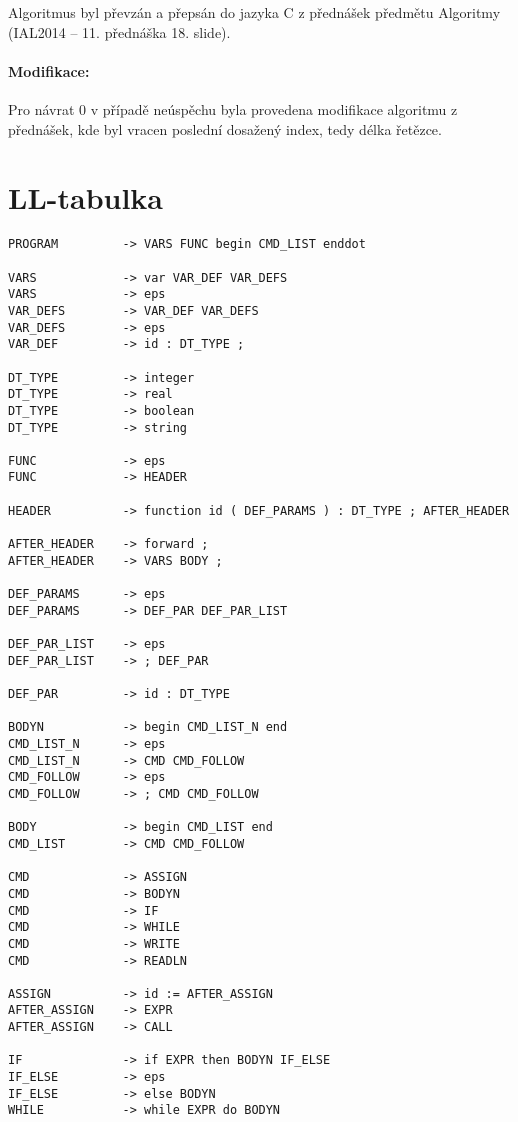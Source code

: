 \documentclass[12pt,a4paper,titlepage,final]{article}
\begin{document}
Algoritmus byl převzán a přepsán do jazyka C z přednášek předmětu Algoritmy (IAL2014
\cite{honzik2} -- 11. přednáška 18. slide).
 
\paragraph{Modifikace:} Pro návrat 0 v případě neúspěchu byla provedena modifikace
algoritmu z přednášek, kde byl vracen poslední dosažený index, tedy délka řetězce.




\section{LL-tabulka} \label{lltabulka}
\begin{verbatim}
PROGRAM         -> VARS FUNC begin CMD_LIST enddot

VARS            -> var VAR_DEF VAR_DEFS
VARS            -> eps
VAR_DEFS        -> VAR_DEF VAR_DEFS
VAR_DEFS        -> eps
VAR_DEF         -> id : DT_TYPE ;

DT_TYPE         -> integer
DT_TYPE         -> real
DT_TYPE         -> boolean
DT_TYPE         -> string

FUNC            -> eps
FUNC            -> HEADER

HEADER          -> function id ( DEF_PARAMS ) : DT_TYPE ; AFTER_HEADER

AFTER_HEADER    -> forward ;
AFTER_HEADER    -> VARS BODY ;

DEF_PARAMS      -> eps
DEF_PARAMS      -> DEF_PAR DEF_PAR_LIST

DEF_PAR_LIST    -> eps
DEF_PAR_LIST    -> ; DEF_PAR

DEF_PAR         -> id : DT_TYPE

BODYN           -> begin CMD_LIST_N end
CMD_LIST_N      -> eps
CMD_LIST_N      -> CMD CMD_FOLLOW
CMD_FOLLOW      -> eps
CMD_FOLLOW      -> ; CMD CMD_FOLLOW

BODY            -> begin CMD_LIST end
CMD_LIST        -> CMD CMD_FOLLOW

CMD             -> ASSIGN
CMD             -> BODYN
CMD             -> IF
CMD             -> WHILE
CMD             -> WRITE
CMD             -> READLN

ASSIGN          -> id := AFTER_ASSIGN
AFTER_ASSIGN    -> EXPR
AFTER_ASSIGN    -> CALL

IF              -> if EXPR then BODYN IF_ELSE
IF_ELSE         -> eps
IF_ELSE         -> else BODYN
WHILE           -> while EXPR do BODYN


\end{verbatim}
\end{document}
